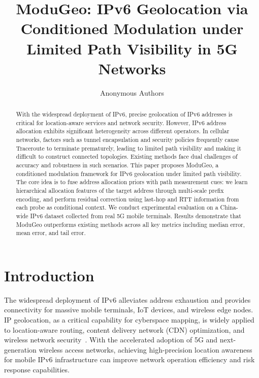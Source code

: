 \documentclass[runningheads]{llncs}
\begin{document}
%
\title{ModuGeo: IPv6 Geolocation via Conditioned Modulation under Limited Path Visibility in 5G Networks}
%
%
\author{Anonymous Authors}
%
%
%
\maketitle              %
%
\begin{abstract}
With the widespread deployment of IPv6, precise geolocation of IPv6 addresses is critical for location-aware services and network security. However, IPv6 address allocation exhibits significant heterogeneity across different operators. In cellular networks, factors such as tunnel encapsulation and security policies frequently cause Traceroute to terminate prematurely, leading to limited path visibility and making it difficult to construct connected topologies. Existing methods face dual challenges of accuracy and robustness in such scenarios. This paper proposes ModuGeo, a conditioned modulation framework for IPv6 geolocation under limited path visibility. The core idea is to fuse address allocation priors with path measurement cues: we learn hierarchical allocation features of the target address through multi-scale prefix encoding, and perform residual correction using last-hop and RTT information from each probe as conditional context. We conduct experimental evaluation on a China-wide IPv6 dataset collected from real 5G mobile terminals. Results demonstrate that ModuGeo outperforms existing methods across all key metrics including median error, mean error, and tail error.

\end{abstract}
%
%
%
\section{Introduction}

The widespread deployment of IPv6 alleviates address exhaustion and provides connectivity for massive mobile terminals, IoT devices, and wireless edge nodes. IP geolocation, as a critical capability for cyberspace mapping, is widely applied to location-aware routing, content delivery network (CDN) optimization, and wireless network security~\cite{RFC7066,GTP20}. With the accelerated adoption of 5G and next-generation wireless access networks, achieving high-precision location awareness for mobile IPv6 infrastructure can improve network operation efficiency and risk response capabilities.
\end{document}
